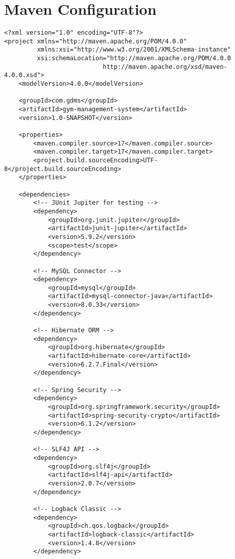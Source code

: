 \documentclass[12pt,a4paper]{report}
\begin{document}
\section{Maven Configuration}
\begin{lstlisting}[caption=pom.xml]
<?xml version="1.0" encoding="UTF-8"?>
<project xmlns="http://maven.apache.org/POM/4.0.0"
         xmlns:xsi="http://www.w3.org/2001/XMLSchema-instance"
         xsi:schemaLocation="http://maven.apache.org/POM/4.0.0 
                           http://maven.apache.org/xsd/maven-4.0.0.xsd">
    <modelVersion>4.0.0</modelVersion>

    <groupId>com.gdms</groupId>
    <artifactId>gym-management-system</artifactId>
    <version>1.0-SNAPSHOT</version>

    <properties>
        <maven.compiler.source>17</maven.compiler.source>
        <maven.compiler.target>17</maven.compiler.target>
        <project.build.sourceEncoding>UTF-8</project.build.sourceEncoding>
    </properties>

    <dependencies>
        <!-- JUnit Jupiter for testing -->
        <dependency>
            <groupId>org.junit.jupiter</groupId>
            <artifactId>junit-jupiter</artifactId>
            <version>5.9.2</version>
            <scope>test</scope>
        </dependency>

        <!-- MySQL Connector -->
        <dependency>
            <groupId>mysql</groupId>
            <artifactId>mysql-connector-java</artifactId>
            <version>8.0.33</version>
        </dependency>

        <!-- Hibernate ORM -->
        <dependency>
            <groupId>org.hibernate</groupId>
            <artifactId>hibernate-core</artifactId>
            <version>6.2.7.Final</version>
        </dependency>

        <!-- Spring Security -->
        <dependency>
            <groupId>org.springframework.security</groupId>
            <artifactId>spring-security-crypto</artifactId>
            <version>6.1.2</version>
        </dependency>

        <!-- SLF4J API -->
        <dependency>
            <groupId>org.slf4j</groupId>
            <artifactId>slf4j-api</artifactId>
            <version>2.0.7</version>
        </dependency>

        <!-- Logback Classic -->
        <dependency>
            <groupId>ch.qos.logback</groupId>
            <artifactId>logback-classic</artifactId>
            <version>1.4.8</version>
        </dependency>


\end{lstlisting}
\end{document}
